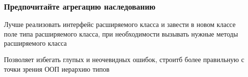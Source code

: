 \documentclass[russian,aspectratio=169,14pt]{beamer}
\begin{document}
\begin{frame}
	\frametitle{Предпочитайте агрегацию наследованию}
	\begin{minipage}{1.0\textwidth}
	Лучше реализовать интерфейс расширяемого класса и завести в новом классе поле типа расширяемого класса, при необходимости вызывать нужные методы расширяемого класса\\
	\end{minipage}
	\begin{minipage}{1.0\textwidth}
	Позволяет избегать глупых и неочевидных ошибок, строитб более правильную с точки зрения ООП иерархию типов
	\end{minipage}
\end{frame}



\questions
\end{document}
